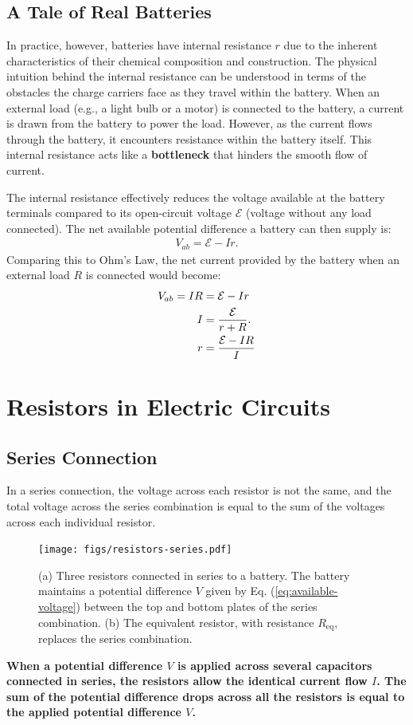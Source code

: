 \documentclass[12pt,b4paper]{article}
\begin{document}
\subsection{A Tale of Real Batteries}
In practice, however, batteries have internal resistance $r$ due to the inherent characteristics of their chemical composition and construction. The physical intuition behind the internal resistance can be understood in terms of the obstacles the charge carriers face as they travel within the battery. When an external load (e.g., a light bulb or a motor) is connected to the battery, a current is drawn from the battery to power the load. However, as the current flows through the battery, it encounters resistance within the battery itself. This internal resistance acts like a \textbf{bottleneck} that hinders the smooth flow of current.

The internal resistance effectively reduces the voltage available at the battery terminals compared to its open-circuit voltage $\mathcal{E}$ (voltage without any load connected). The net available potential difference a battery can then supply is:
\begin{align}
    V_{ab}=\mathcal{E}-Ir.\label{eq:available-voltage}
\end{align}
Comparing this to Ohm's Law, the net current provided by the battery when an external load $R$ is connected would become:
\begin{align}
    V_{ab}=IR&=\mathcal{E}-Ir\notag\\
    I&=\frac{\mathcal{E}}{r+R}.\\
    r&=\frac{\mathcal{E}-IR}{I}
\end{align}
\section{Resistors in Electric Circuits}
\subsection{Series Connection}
In a series connection, the voltage across each resistor is not the same, and the total voltage across the series combination is equal to the sum of the voltages across each individual resistor.
\begin{figure}
    \centering
    \texttt{[image: figs/resistors-series.pdf]}
    \caption{(a) Three resistors connected in series to a battery. The battery maintains a potential difference $V$ given by Eq. (\ref{eq:available-voltage}) between the top and bottom plates of the series combination. (b) The equivalent resistor, with resistance $R_\text{eq}$, replaces the series combination.}
    \label{fig:resistance-series}
\end{figure}
\textbf{When a potential difference $V$ is applied across several capacitors connected in series, the resistors allow the identical current flow $I$. The sum of the potential difference drops across all the resistors is equal to the applied potential difference $V$.}
\end{document}

